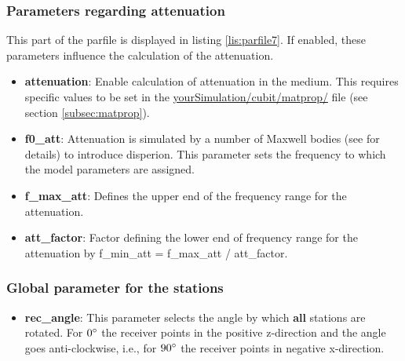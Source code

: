     	\subsubsection{Parameters regarding attenuation}
			This part of the parfile is displayed in listing \ref{lis:parfile7}. If enabled, these parameters influence the calculation of the attenuation.
			
    \begin{itemize}
    	\item \textbf{attenuation}: Enable calculation of attenuation in the medium. This requires specific values to be set in the \url{yourSimulation/cubit/matprop/} file (see section \ref{subsec:matprop}).
    	\item \textbf{f0\_att}: Attenuation is simulated by a number of Maxwell bodies (see \cite{Lambrecht.2015} for details) to introduce disperion. This parameter sets the frequency to which the model parameters are assigned.
		\item \textbf{f\_max\_att}: Defines the upper end of the frequency range for the attenuation.
		\item \textbf{att\_factor}: Factor defining the lower end of frequency range for the attenuation by f\_min\_att = f\_max\_att / att\_factor.
    \end{itemize}
    
		\subsubsection{Global parameter for the stations}
			
    	\begin{itemize}
    	 \item \textbf{rec\_angle}: This parameter selects the angle by which \textbf{all} stations are rotated. For $0\degree$ the receiver points in the positive z-direction and the angle goes anti-clockwise, i.e., for $90\degree$ the receiver points in negative x-direction.
    	\end{itemize}

